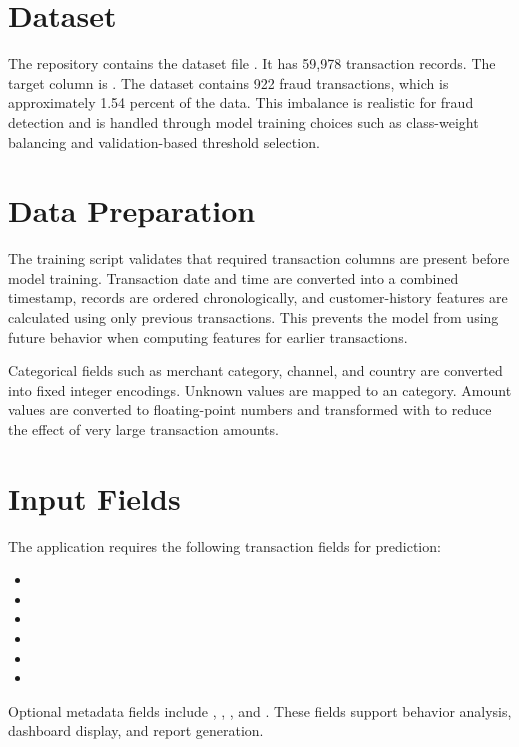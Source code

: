 \documentclass[12pt,a4paper]{report}
\begin{document}
\section{Dataset}
The repository contains the dataset file . It has 59,978 transaction records. The target column is . The dataset contains 922 fraud transactions, which is approximately 1.54 percent of the data. This imbalance is realistic for fraud detection and is handled through model training choices such as class-weight balancing and validation-based threshold selection.

\section{Data Preparation}
The training script validates that required transaction columns are present before model training. Transaction date and time are converted into a combined timestamp, records are ordered chronologically, and customer-history features are calculated using only previous transactions. This prevents the model from using future behavior when computing features for earlier transactions.

Categorical fields such as merchant category, channel, and country are converted into fixed integer encodings. Unknown values are mapped to an  category. Amount values are converted to floating-point numbers and transformed with  to reduce the effect of very large transaction amounts.

\section{Input Fields}
The application requires the following transaction fields for prediction:
\begin{itemize}
    \item {}
    \item {}
    \item {}
    \item {}
    \item {}
    \item {}
\end{itemize}

Optional metadata fields include , , , and . These fields support behavior analysis, dashboard display, and report generation.
\end{document}
